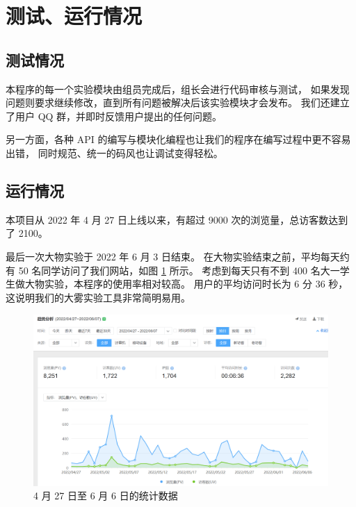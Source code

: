 \section{测试、运行情况}

\subsection{测试情况}

本程序的每一个实验模块由组员完成后，组长会进行代码审核与测试，
如果发现问题则要求继续修改，直到所有问题被解决后该实验模块才会发布。
我们还建立了用户 QQ 群，并即时反馈用户提出的任何问题。

另一方面，各种 API 的编写与模块化编程也让我们的程序在编写过程中更不容易出错，
同时规范、统一的码风也让调试变得轻松。

\subsection{运行情况}

本项目从 2022 年 4 月 27 日上线以来，有超过 9000 次的浏览量，总访客数达到了 2100。


最后一次大物实验于 2022 年 6 月 3 日结束。
在大物实验结束之前，平均每天约有 50 名同学访问了我们网站，如图 \ref{fig:2} 所示。
考虑到每天只有不到 400 名大一学生做大物实验，本程序的使用率相对较高。
用户的平均访问时长为 6 分 36 秒，这说明我们的大雾实验工具非常简明易用。

\begin{figure}[htbp]
  \centering
  \includegraphics[width=\columnwidth]{figure/2.png}
  \caption{4 月 27 日至 6 月 6 日的统计数据}
  \label{fig:2}
\end{figure}